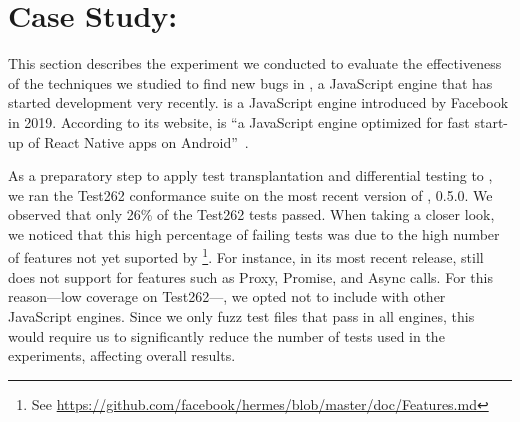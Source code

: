 \documentclass[smallextended]{svjour3}
\begin{document}
\section{Case Study: \hermes}
\label{sec:hermes}

This section describes the experiment we conducted to evaluate the
effectiveness of the techniques we studied to find new bugs in
\hermes, a JavaScript engine that has started development very
recently. \hermes is a JavaScript engine introduced by Facebook in
2019. According to its website, \hermes is ``a JavaScript engine
optimized for fast start-up of React Native apps on
Android''~\cite{hermes2020repo}.

As a preparatory step to apply test transplantation and differential
testing to \hermes, we ran the Test262 conformance suite on the most
recent version of \hermes, 0.5.0. We observed that only 26\% of the
Test262 tests passed. When taking a closer look, we noticed that this
high percentage of failing tests was due to the high number of
features not yet suported by \hermes\footnote{See
  \url{https://github.com/facebook/hermes/blob/master/doc/Features.md}}. For
instance, in its most recent release, \hermes still does not support
for features such as Proxy, Promise, and Async calls. For this
reason---low coverage on Test262---, we opted not to include \hermes
with other JavaScript engines. Since we only fuzz test files that pass
in all engines, this would require us to significantly reduce the
number of tests used in the experiments, affecting overall results.
\end{document}
